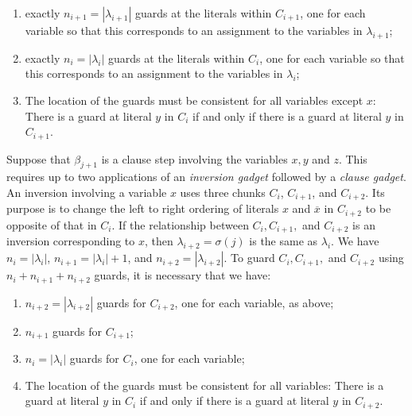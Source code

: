 \documentclass[11pt]{article}
\begin{document}
\begin{enumerate}
 \item exactly $n_{i+1} = |\lambda_{i+1}|$ guards at the literals within $C_{i+1}$, one for each variable so that this corresponds to an assignment to the variables in $\lambda_{i+1}$;
 \item exactly $n_i = |\lambda_i|$ guards at the literals within $C_i$, one for each variable so that this corresponds to an assignment to the variables in $\lambda_i$;
 \item The location of the guards must be consistent for all variables except $x$: There is a guard at literal $y$ in $C_i$ if and only if there is a guard at literal $y$ in $C_{i+1}$.
\end{enumerate}

Suppose that $\beta_{j+1}$ is a clause step involving the variables $x, y$ and $z$.  This requires up to two applications of an \textit{inversion gadget} followed by a \textit{clause gadget}.  An inversion involving a variable $x$ uses three chunks $C_i$, $C_{i+1}$, and $C_{i+2}$. Its purpose
is to change the left to right ordering of literals $x$ and $\overline{x}$ in $C_{i+2}$ to be opposite of that in $C_i$.  If the relationship between $C_i, C_{i+1},$ and $C_{i+2}$ is an inversion corresponding to $x$, then $\lambda_{i+2} = \sigma(j)$ is the same as $\lambda_i$.  We have $n_i = |\lambda_i|$, 
$n_{i+1} = |\lambda_i| + 1$, and $n_{i+2} = |\lambda_{i+2}|$. To guard $C_i, C_{i+1},$ and $C_{i+2}$ using $n_i + n_{i+1} + n_{i+2}$ guards, it is necessary that we have:

\begin{enumerate}
 \item $n_{i+2} = |\lambda_{i+2}|$ guards for $C_{i+2}$, one for each variable, as above;
 \item $n_{i+1}$ guards for $C_{i+1}$;
 \item $n_i = |\lambda_i|$ guards for $C_i$, one for each variable;
 \item The location of the guards must be consistent for all variables: There is a guard at literal $y$ in $C_i$ if and only if there is a guard at literal $y$ in $C_{i+2}$.
\end{enumerate}
\end{document}
